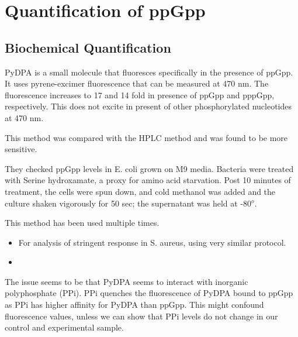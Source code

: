 \chapter{Quantification of ppGpp}

\section{Biochemical Quantification}

PyDPA is a small molecule that fluoresces specifically in the presence of ppGpp.
It uses pyrene-excimer fluorescence that can be measured at 470 nm. 
The fluorescence increases to 17 and 14 fold in presence of ppGpp and pppGpp, respectively.
This does not excite in present of other phosphorylated nucleotides at 470 nm.

This method was compared with the HPLC method and was found to be more sensitive. 

They checked ppGpp levels in E. coli grown on M9 media. Bacteria were treated with Serine hydroxamate, a proxy for amino acid starvation. 
Post 10 minutes of treatment, the cells were spun down, and cold methanol was added and the culture shaken vigorously for 50 sec; the supernatant was held at -80$^o$.

This method has been used multiple times. 

\begin{itemize}
	\item For analysis of stringent response in S. aureus, using very similar protocol.
	\item
\end{itemize}

The issue seems to be that PyDPA seems to interact with inorganic polyphosphate (PPi).
PPi quenches the fluorescence of PyDPA bound to ppGpp as PPi has higher affinity for PyDPA than ppGpp.
This might confound fluorescence values, unless we can show that PPi levels do not change in our control and experimental sample. 